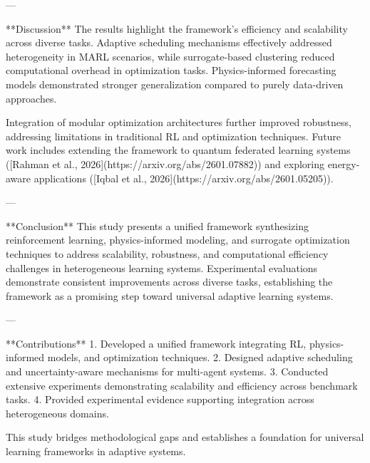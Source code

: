 ---

**Discussion**  
The results highlight the framework's efficiency and scalability across diverse tasks. Adaptive scheduling mechanisms effectively addressed heterogeneity in MARL scenarios, while surrogate-based clustering reduced computational overhead in optimization tasks. Physics-informed forecasting models demonstrated stronger generalization compared to purely data-driven approaches.  

Integration of modular optimization architectures further improved robustness, addressing limitations in traditional RL and optimization techniques. Future work includes extending the framework to quantum federated learning systems ([Rahman et al., 2026](https://arxiv.org/abs/2601.07882)) and exploring energy-aware applications ([Iqbal et al., 2026](https://arxiv.org/abs/2601.05205)).

---

**Conclusion**  
This study presents a unified framework synthesizing reinforcement learning, physics-informed modeling, and surrogate optimization techniques to address scalability, robustness, and computational efficiency challenges in heterogeneous learning systems. Experimental evaluations demonstrate consistent improvements across diverse tasks, establishing the framework as a promising step toward universal adaptive learning systems.

---

**Contributions**  
1. Developed a unified framework integrating RL, physics-informed models, and optimization techniques.  
2. Designed adaptive scheduling and uncertainty-aware mechanisms for multi-agent systems.  
3. Conducted extensive experiments demonstrating scalability and efficiency across benchmark tasks.  
4. Provided experimental evidence supporting integration across heterogeneous domains.  

This study bridges methodological gaps and establishes a foundation for universal learning frameworks in adaptive systems.